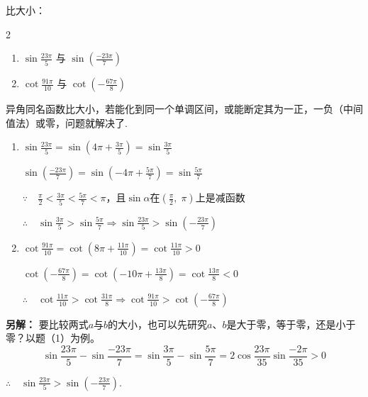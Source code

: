 \begin{example}
    比大小：
\begin{multicols}{2}
    \begin{enumerate}[(1)]
    \item $\sin\frac{23\pi}{5}$ 与 $\sin\left(\frac{-23\pi}{7}\right)$
    \item $\cot\frac{91\pi}{10}$ 与 $\cot\left(-\frac{67\pi}{8}\right)$
\end{enumerate}
\end{multicols}
\end{example}

\begin{analyze}
异角同名函数比大小，若能化到同一个单调区间，或能断定其为一正，一负（中间值法）或零，问题就解决了.
\end{analyze}

\begin{solution}
\begin{enumerate}
    \item $\sin\frac{23\pi}{5}=\sin\left(4\pi+\frac{3\pi}{5}\right)=\sin\frac{3\pi}{5}$

$\sin\left(\frac{-23\pi}{7}\right)=\sin\left(-4\pi+\frac{5\pi}{7}\right)=\sin\frac{5\pi}{7}$

$\because\quad \frac{\pi}{2}<\frac{3\pi}{5}<\frac{5\pi}{7}<\pi$，且$\sin\alpha$在$\left(\frac{\pi}{2},\; \pi\right)$上是减函数

$\therefore\quad \sin\frac{3\pi}{5}>\sin\frac{5\pi}{7} \Longrightarrow \sin\frac{23\pi}{5}>\sin\left(-\frac{23\pi}{7}\right)$

\item $\cot\frac{91\pi}{10}=\cot\left(8\pi+\frac{11\pi}{10}\right)=\cot\frac{11\pi}{10}>0$

$\cot\left(-\frac{67\pi}{8}\right)=\cot\left(-10\pi+\frac{13\pi}{8}\right)=\cot\frac{13\pi}{8}<0$

$\therefore\quad \cot\frac{11\pi}{10}>\cot\frac{31\pi}{8}\Longrightarrow \cot\frac{91\pi}{10}>\cot\left(-\frac{67\pi}{8}\right)$
\end{enumerate}    

\textbf{另解：} 要比较两式$a$与$b$的大小，也可以先研究$a$、$b$是大于零，等于零，还是小于零？以题（1）为例。
\[\sin\frac{23\pi}{5}-\sin\frac{-23\pi}{7}=\sin\frac{3\pi}{5}-\sin\frac{5\pi}{7}=2\cos\frac{23\pi}{35}\sin\frac{-2\pi}{35}>0\]

$\therefore\quad \sin\frac{23\pi}{5}>\sin\left(-\frac{23\pi}{7}\right)$.
\end{solution}

